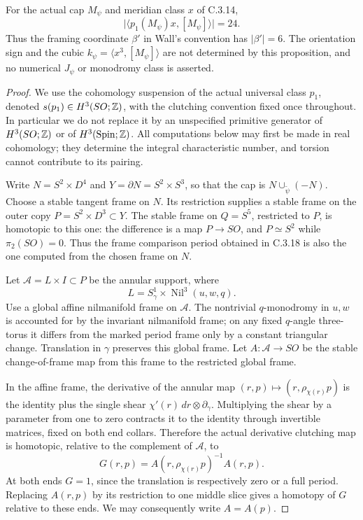 \begin{proposition}
For the actual cap $M_\psi$ and meridian class $x$ of C.3.14,
\[
 \bigl|\langle p_1(M_\psi)x,[M_\psi]\rangle\bigr|=24.
\]
Thus the framing coordinate $\beta'$ in Wall's convention has
$|\beta'|=6$. The orientation sign and the cubic
$k_\psi=\langle x^3,[M_\psi]\rangle$ are not determined by
this proposition, and no numerical $J_\psi$ or monodromy class
is asserted.
\end{proposition}
\begin{proof}
We use the cohomology suspension of the actual universal class
$p_1$, denoted $s(p_1)\in H^3(SO;\mathbb Z)$, with the clutching
convention fixed once throughout. In particular we do not
replace it by an unspecified primitive generator of
$H^3(SO;\mathbb Z)$ or of $H^3(\operatorname{Spin};\mathbb Z)$.
All computations below may first be made in real cohomology;
they determine the integral characteristic number, and torsion
cannot contribute to its pairing.

Write $N=S^2\times D^4$ and $Y=\partial N=S^2\times S^3$,
so that the cap is $N\cup_{\widetilde\psi}(-N)$. Choose a
stable tangent frame on $N$. Its restriction supplies a stable
frame on the outer copy $P=S^2\times D^3\subset Y$. The
stable frame on $Q=S^5$, restricted to $P$, is homotopic to
this one: the difference is a map $P\to SO$, and
$P\simeq S^2$ while $\pi_2(SO)=0$. Thus the frame comparison
period obtained in C.3.18 is also the one computed from the
chosen frame on $N$.

Let $\mathcal A=L\times I\subset P$ be the annular support,
where
\[
 L=S^1_\gamma\times\operatorname{Nil}^3(u,w,q).
\]
Use a global affine nilmanifold frame on $\mathcal A$.
The nontrivial $q$-monodromy in $u,w$ is accounted for by
the invariant nilmanifold frame; on any fixed $q$-angle
three-torus it differs from the marked period frame only
by a constant triangular change. Translation in $\gamma$
preserves this global frame. Let
$A:\mathcal A\to SO$ be the stable change-of-frame map
from this frame to the restricted global frame.

In the affine frame, the derivative of the annular map
$(r,p)\mapsto(r,\rho_{\chi(r)}p)$ is the identity plus
the single shear $\chi'(r)\,dr\otimes\partial_\gamma$.
Multiplying the shear by a parameter from one to zero
contracts it to the identity through invertible matrices,
fixed on both end collars. Therefore the actual derivative
clutching map is homotopic, relative to the complement of
$\mathcal A$, to
\[
 G(r,p)=A(r,\rho_{\chi(r)}p)^{-1}A(r,p).
\]
At both ends $G=1$, since the translation is respectively
zero or a full period. Replacing $A(r,p)$ by its restriction
to one middle slice gives a homotopy of $G$ relative to
these ends. We may consequently write $A=A(p)$.


\end{proof}
